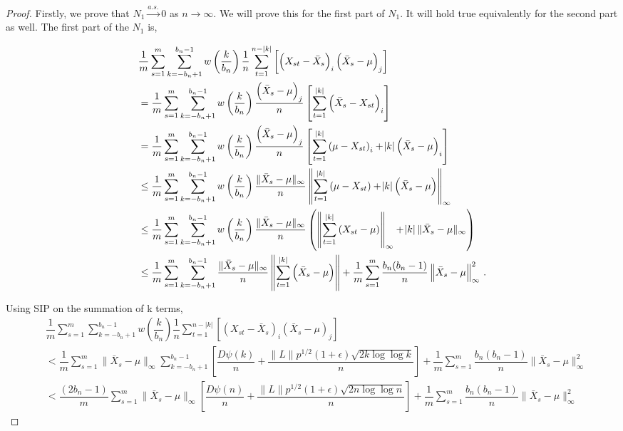 \documentclass[11pt]{article}
\theoremstyle{remark}
\begin{document}
\begin{proof}
Firstly, we prove that  $N_1 \xrightarrow{a.s.} 0$ as $n \to \infty$. We will prove this for the first part of $N_1$. It will hold true equivalently for the second part as well. The first part of the $N_1$ is,


\begin{align*}
    & \dfrac{1}{m}\sum_{s=1}^{m}\sum_{k=-b_n+1}^{b_n-1}w\left(\dfrac{k}{b_n}\right)\dfrac{1}{n}\sum_{t=1}^{n-|k|}\left[ \left(X_{st} - \bar{X}_s \right)_i  \left(\bar{X}_s - \mu \right)_j \right]\\
    & = \dfrac{1}{m}\sum_{s=1}^{m}\sum_{k=-b_n+1}^{b_n-1}w\left(\dfrac{k}{b_n}\right)\dfrac{  \left(\bar{X}_s - \mu \right)_j}{n} \left[\sum\limits_{t=1}^{|k|} \left(\bar{X}_s - X_{st} \right)_i\right]\\
    & = \dfrac{1}{m}\sum_{s=1}^{m}\sum_{k=-b_n+1}^{b_n-1} w\left(\dfrac{k}{b_n}\right) \dfrac{\left(\bar{X}_s - \mu \right)_j}{n} \left[\sum_{t=1}^{|k|} \left(\mu - X_{st} \right)_i + \abs{k} \left(\bar{X}_s - \mu \right)_i\right]\\
    & \leq \dfrac{1}{m}\sum_{s=1}^{m}\sum_{k=-b_n+1}^{b_n-1}w\left(\dfrac{k}{b_n}\right)\dfrac{\|\bar{X}_s - \mu\|_{\infty}}{n} \left\|\sum_{t=1}^{|k|} \left(\mu - X_{st} \right) + \abs{k} \left(\bar{X}_s - \mu \right)\right\|_{\infty}\\
    & \leq \dfrac{1}{m}\sum_{s=1}^{m}\sum_{k=-b_n+1}^{b_n-1}w\left(\dfrac{k}{b_n}\right)\dfrac{\|\bar{X}_s - \mu\|_{\infty}}{n} \left(\left\|\sum_{t=1}^{|k|}  \left(X_{st} - \mu \right)\right\|_{\infty} + \abs{k}\|\bar{X}_s - \mu\|_{\infty} \right)\\
    & \leq \dfrac{1}{m}\sum_{s=1}^{m}\sum_{k=-b_n+1}^{b_n-1}\dfrac{\|\bar{X}_s - \mu\|_{\infty}}{n}\left\|\sum_{t=1}^{|k|} \left(\bar{X}_s - \mu\right) \right\| + \dfrac{1}{m}\sum\limits_{s=1}^{m} \dfrac{b_n(b_n-1)}{n} \left \|\bar{X}_s - \mu \right \|_{\infty}^2\,.
\end{align*}

Using SIP on the summation of k terms,
\begin{align*}
    & \dfrac{1}{m}\sum_{s=1}^{m}\sum_{k=-b_n+1}^{b_n-1}w\left(\dfrac{k}{b_n}\right)\dfrac{1}{n}\sum_{t=1}^{n-|k|}\left[ \left(X_{st} - \bar{X}_s \right)_i  \left(\bar{X}_s - \mu \right)_j \right]\\
   &  < \dfrac{1}{m}\sum\limits_{s=1}^{m}\|\bar{X}_s - \mu\|_{\infty}\sum\limits_{k=-b_n + 1}^{b_n-1}\left[ \dfrac{D \psi(k)}{n} + \dfrac{\|L\| p^{1/2}(1+\epsilon)\sqrt{2k \log\log k}}{n}  \right] + \dfrac{1}{m}\sum\limits_{s=1}^{m} \dfrac{b_n(b_n-1)}{n}\|\bar{X}_s - \mu\|_{\infty}^2\\
   &  < \dfrac{(2b_n-1)}{m}\sum\limits_{s=1}^{m}\|\bar{X}_s - \mu\|_{\infty}\left[ \dfrac{D \psi(n)}{n} + \dfrac{\|L\| p^{1/2}(1+\epsilon)\sqrt{2n \log\log n}}{n}  \right] + \dfrac{1}{m}\sum\limits_{s=1}^{m} \dfrac{b_n(b_n-1)}{n}\|\bar{X}_s - \mu\|_{\infty}^2
\end{align*}


\end{proof}
\end{document}
